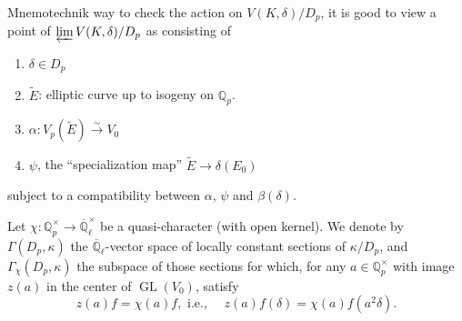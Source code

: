 \documentclass[11pt,a4paper]{article}
\theoremstyle{plain}
\theoremstyle{definition}
\theoremstyle{remark}
\DeclareMathOperator{\GL}{GL}
\newcommand{\Qp}{\mathbb{Q}_{p}}
\newcommand{\Qlbar}{\overline{\mathbb{Q}}_{\ell}}
\newcommand{\Vp}{V_{p}}
\begin{document}
Mnemotechnik way to check the action on $V(K, \delta)/D_{p}$, it is good to view a point of $\varprojlim V(K, \delta)/D_{p}$ as consisting of
\begin{enumerate}[label=(\alph*)]
\item $\delta \in D_{p}$
\item $\widetilde{E}$: elliptic curve up to isogeny on $\Qp$.
\item $\alpha : \Vp(\widetilde{E}) \xrightarrow{\sim} V_{0}$
\item $\psi$, the ``specialization map'' $\widetilde{E} \to \delta(E_{0})$
\end{enumerate}
subject to a compatibility between $\alpha$, $\psi$ and $\beta(\delta)$.

Let $\chi : \Qp^{\times} \to \Qlbar^{\times}$ be a quasi-character (with open kernel). We denote by $\Gamma(D_{p}, \kappa)$ the $\Qlbar$-vector space of locally constant sections of $\kappa/D_{p}$, and $\Gamma_{\chi}(D_{p}, \kappa)$ the subspace of those sections for which, for any $a \in \Qp^{\times}$ with image $z(a)$ in the center of $\GL(V_{0})$, satisfy
\[
z(a)f = \chi(a)f, \text{ i.e., } \quad z(a)f(\delta) = \chi(a)f(a^{2}\delta).
\]
\end{document}
